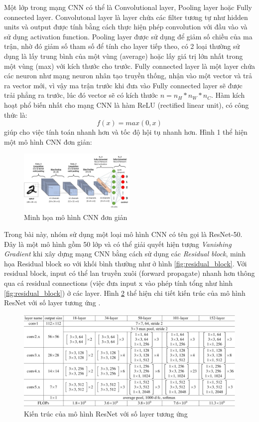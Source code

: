 \documentclass[conference]{IEEEtran}
\begin{document}
Một lớp trong mạng CNN có thể là Convolutional layer, Pooling layer hoặc Fully connected layer. Convolutonal layer là layer chứa các filter tương tự như hidden units và output được tính bằng cách thực hiện phép convolution với đầu vào và sử dụng activation function. Pooling layer được sử dụng để giảm số chiều của ma trận, nhờ đó giảm số tham số để tính cho layer tiếp theo, có 2 loại thường sử dụng là lấy trung bình của một vùng (average) hoặc lấy giá trị lớn nhất trong một vùng (max) với kích thước cho trước. Fully connected layer là một layer chứa các neuron như mạng neuron nhân tạo truyền thống, nhận vào một vector và trả ra vector mới, vì vậy ma trận trước khi đưa vào Fully connected layer sẽ được trải phẳng ra trước, lúc đó vector sẽ có kích thước $n=n_{H}*n_{W}*n_{C}$. Hàm kích hoạt phổ biến nhất cho mạng CNN là hàm ReLU (rectified linear unit), có công thức là:
$$f(x)=max(0,x)$$
giúp cho việc tính toán nhanh hơn và tốc độ hội tụ nhanh hơn. Hình 1 thể hiện một mô hình CNN đơn giản:

\begin{figure}[h]
\includegraphics[width=0.5\textwidth]{assets/simpleCNN.jpeg}
  \caption{Minh họa mô hình CNN đơn giản}
  \label{fig:CNN_architecture}
\end{figure}

Trong bài này, nhóm sử dụng một loại mô hình CNN có tên gọi là ResNet-50\cite{he2015deep}. Đây là một mô hình gồm 50 lớp và có thể giải quyết hiện tượng \textit{Vanishing Gradient} khi xây dựng mạng CNN bằng cách sử dụng các \textit{Residual block}, minh họa Residual block so với khối bình thường như ở hình \ref{fig:residual_block}. Với residual block, input có thể lan truyền xuôi (forward propagate) nhanh hơn thông qua cá residual connections (việc đưa input x vào phép tính tổng như hình \ref{fig:residual_block}) ở các layer. Hình \ref{fig:resnet_architecture} thể hiện chi tiết kiến trúc của mô hình ResNet với số layer tương ứng \cite{he2015deep}.

\begin{figure}[h]
\includegraphics[width=\textwidth]{assets/resnet.png}
  \caption{Kiến trúc của mô hình ResNet với số layer tương ứng }
  \label{fig:resnet_architecture}
\end{figure}
\end{document}
